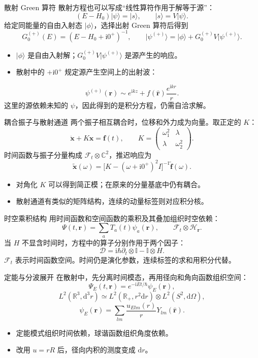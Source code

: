 \documentclass[aspectratio=169,11pt]{beamer}
\newcommand{\dd}{\mathrm d}
\newcommand{\ii}{\mathrm i}
\newcommand{\id}{\mathbb I}
\newcommand{\ket}[1]{\lvert #1\rangle}
\begin{document}
\begin{frame}{散射 Green 算符}
散射方程也可以写成“线性算符作用于解等于源”：
\[
(E-H_0)\ket{\psi}=\ket{s},\qquad \ket{s}=V\ket{\psi}.
\]
给定同能量的自由入射态 $\ket{\phi}$，选择出射 Green 算符后得到
\[
G_0^{(+)}(E)=(E-H_0+\ii0^+)^{-1},\qquad
\ket{\psi^{(+)}}=\ket{\phi}+G_0^{(+)}V\ket{\psi^{(+)}}.
\]
\begin{itemize}
\item $\ket{\phi}$ 是自由入射解；$G_0^{(+)}V\ket{\psi^{(+)}}$ 是源产生的响应。
\item 散射中的 $+\ii0^+$ 规定源产生空间上的出射波：
\end{itemize}
\[
\psi^{(+)}(\bm r)\sim e^{\ii kz}+f(\hat{\bm r})\frac{e^{\ii kr}}{r}.
\]
这里的源依赖未知的 $\psi$，因此得到的是积分方程，仍需自洽求解。
\end{frame}

\begin{frame}{耦合振子与散射通道}
两个振子相互耦合时，位移和外力成为向量。取正定的 $K$：
\[
\ddot{\bm x}+K\bm x=\bm f(t),\qquad
K=\begin{pmatrix}\omega_1^2&\lambda\\\lambda&\omega_2^2\end{pmatrix}.
\]
时间函数与振子分量构成 $\mathcal F_t\otimes\mathbb C^2$，推迟响应为
\[
\widetilde{\bm x}(\omega)
=\bigl[K-(\omega+\ii0^+)^2I\bigr]^{-1}\widetilde{\bm f}(\omega).
\]
\begin{itemize}
\item 对角化 $K$ 可以得到简正模；在原来的分量基底中仍有耦合。
\item 散射通道有类似的矩阵结构，连续的动量标签则对应积分核。
\end{itemize}
\end{frame}

\begin{frame}{时空乘积结构}
用时间函数和空间函数的乘积及其叠加组织时空依赖：
\[
\Psi(t,\bm r)=\sum_a T_a(t)\psi_a(\bm r),
\qquad \mathcal F_t\otimes\mathcal H_{\bm r}.
\]
当 $H$ 不显含时间时，方程中的算子分别作用于两个因子：
\[
\mathcal D=\ii\hbar\partial_t\otimes\id-\id\otimes H.
\]
$\mathcal F_t$ 表示时间函数空间。时间仍是演化参数，连续标签的求和用积分代替。
\end{frame}

\begin{frame}{定能与分波展开}
在散射中，先分离时间模态，再用径向和角向函数组织空间：
\[
\Psi_E(t,\bm r)=e^{-\ii Et/\hbar}\psi_E(\bm r),
\]
\[
L^2(\mathbb R^3,\dd^3r)
\simeq L^2(\mathbb R_+,r^2\dd r)\otimes L^2(S^2,\dd\Omega),
\]
\[
\psi_E(\bm r)=\sum_{lm}\frac{u_{Elm}(r)}{r}Y_{lm}(\hat{\bm r}).
\]
\begin{itemize}
\item 定能模式组织时间依赖，球谐函数组织角度依赖。
\item 改用 $u=rR$ 后，径向内积的测度变成 $\dd r$。
\end{itemize}
\end{frame}
\end{document}

